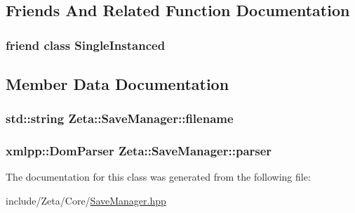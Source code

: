 \subsection{Friends And Related Function Documentation}
\hypertarget{classZeta_1_1SaveManager_a2fa95d69b32a77fffa4b730679a8b08c}{
\subsubsection[{Single\+Instanced}]{\setlength{\rightskip}{0pt plus 5cm}friend class {\bf Single\+Instanced}\hspace{0.3cm}{\ttfamily [friend]}}}\label{classZeta_1_1SaveManager_a2fa95d69b32a77fffa4b730679a8b08c}


\subsection{Member Data Documentation}
\hypertarget{classZeta_1_1SaveManager_ad94304e398c256cf5f661e4d34317cf5}{
\subsubsection[{filename}]{\setlength{\rightskip}{0pt plus 5cm}std\+::string Zeta\+::\+Save\+Manager\+::filename\hspace{0.3cm}{\ttfamily [private]}}}\label{classZeta_1_1SaveManager_ad94304e398c256cf5f661e4d34317cf5}
\hypertarget{classZeta_1_1SaveManager_a53455bdada02c8001e49ae1bb19febe7}{
\subsubsection[{parser}]{\setlength{\rightskip}{0pt plus 5cm}xmlpp\+::\+Dom\+Parser Zeta\+::\+Save\+Manager\+::parser\hspace{0.3cm}{\ttfamily [private]}}}\label{classZeta_1_1SaveManager_a53455bdada02c8001e49ae1bb19febe7}


The documentation for this class was generated from the following file\+:\begin{DoxyCompactItemize}
\item 
include/\+Zeta/\+Core/\hyperlink{SaveManager_8hpp}{Save\+Manager.\+hpp}\end{DoxyCompactItemize}
